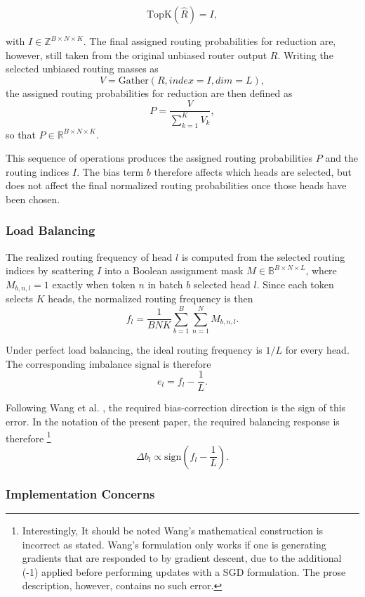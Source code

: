 \documentclass[11pt]{article}
\begin{document}
\[
\mathrm{TopK}(\hat{R}) = I,
\]

with $I \in \mathbb{Z}^{B \times N \times K}$. The final assigned routing probabilities for reduction are, however, still taken from the original unbiased router output $R$. Writing the selected unbiased routing masses as
\[
V = \mathrm{Gather}(R, index=I, dim=L),
\]
the assigned routing probabilities for reduction are then defined as
\[
P = \frac{V}{\sum_{k=1}^{K} V_k},
\]
so that $P \in \mathbb{R}^{B \times N \times K}$.

This sequence of operations produces the assigned routing probabilities $P$ and the routing indices $I$. The bias term $b$ therefore affects which heads are selected, but does not affect the final normalized routing probabilities once those heads have been chosen.

\subsubsection{Load Balancing}

The realized routing frequency of head $l$ is computed from the selected routing indices by scattering $I$ into a Boolean assignment mask $M \in \mathbb{B}^{B \times N \times L}$, where $M_{b,n,l}=1$ exactly when token $n$ in batch $b$ selected head $l$. Since each token selects $K$ heads, the normalized routing frequency is then
\[
f_l = \frac{1}{BNK} \sum_{b=1}^{B} \sum_{n=1}^{N} M_{b,n,l}.
\]

Under perfect load balancing, the ideal routing frequency is $1/L$ for every head. The corresponding imbalance signal is therefore
\[
e_l = f_l - \frac{1}{L}.
\]

Following Wang et al. \cite{wang2024auxiliarylossfree}, the required bias-correction direction is the sign of this error. In the notation of the present paper, the required balancing response is therefore \footnote{Interestingly, It should be noted Wang's mathematical construction is incorrect as stated.  Wang's formulation only works if one is generating gradients that are responded to by gradient descent, due to the additional (-1) applied before performing updates with a SGD formulation. The prose description, however, contains no such error.}
\[
\Delta b_l \propto \mathrm{sign}\!\left(f_l - \frac{1}{L}\right).
\]

\subsubsection{Implementation Concerns}
\end{document}
